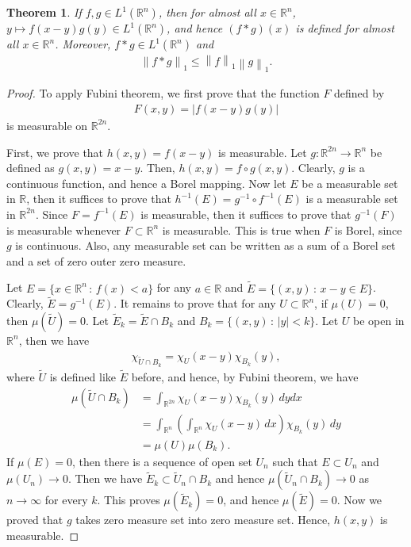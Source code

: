 \documentclass[11pt]{book}
\newtheorem{theorem}{Theorem}[chapter]
\theoremstyle{definition}
\numberwithin{equation}{chapter}
\begin{document}
\begin{theorem}
If $f, g \in L^1(\mathbb{R}^n)$, then for almost all $x \in \mathbb{R}^n$, $y \mapsto f(x-y)g(y) \in L^1(\mathbb{R}^n)$, and hence $(f*g)(x)$ is defined for almost all $x \in \mathbb{R}^n$. Moreover, $f*g \in L^1(\mathbb{R}^n)$ and
\begin{align*}
    \left\|f*g\right\|_1 \leq \left\|f\right\|_1 \left\|g\right\|_1.
\end{align*}
\end{theorem}
\begin{proof}
To apply Fubini theorem, we first prove that the function $F$ defined by 
\begin{align*}
    F(x,y) = \left|f(x-y)g(y)\right|
\end{align*}
is measurable on $\mathbb{R}^{2n}$.

First, we prove that $h(x,y) = f(x-y)$ is measurable. Let $g: \mathbb{R}^{2n} \to \mathbb{R}^{n}$ be defined as $g(x,y) = x - y$. Then, $h(x,y) = f \circ g(x,y)$. Clearly, $g$ is a continuous function, and hence a Borel mapping. Now let $E$ be a measurable set in $\mathbb{R}$, then it suffices to prove that $h^{-1}(E) = g^{-1} \circ f^{-1}(E)$ is a measurable set in $\mathbb{R}^{2n}$. Since $F = f^{-1}(E)$ is measurable, then it suffices to prove that $g^{-1}(F)$ is measurable whenever $F \subset \mathbb{R}^n$ is measurable. This is true when $F$ is Borel, since $g$ is continuous. Also, any measurable set can be written as a sum of a Borel set and a set of zero outer zero measure. 
    
Let $E = \{x \in \mathbb{R}^n \,:\, f(x) < a\}$ for any $a \in \mathbb{R}$ and $\widetilde{E} = \{(x,y) \,:\, x - y \in E\}$. Clearly, $\widetilde{E} = g^{-1}(E)$. It remains to prove that for any $U \subset \mathbb{R}^n$, if $\mu(U) = 0$, then $\mu(\widetilde{U}) = 0$. Let $\widetilde{E}_k = \widetilde{E} \cap B_k$ and $B_k = \{(x,y) \,:\, \left|y\right| < k\}$. Let $U$ be open in $\mathbb{R}^n$, then we have
\begin{align*}
    \chi_{\widetilde{U} \cap B_k} = \chi_{U}(x-y) \chi_{B_k}(y),
\end{align*}
where $\widetilde{U}$ is defined like $\widetilde{E}$ before, and hence, by Fubini theorem, we have
\begin{align*}
    \mu\left(\widetilde{U} \cap B_k\right) & = \int_{\mathbb{R}^{2n}} \chi_{U}(x-y) \chi_{B_k}(y) \,dy dx \\
    & = \int_{\mathbb{R}^{n}} \left(\int_{\mathbb{R}^{n}} \chi_{U}(x-y) \,dx\right) \chi_{B_k}(y) \,dy \\
    & = \mu(U) \mu(B_k).
\end{align*}
If $\mu(E) = 0$, then there is a sequence of open set $U_n$ such that $E \subset U_n$ and $\mu(U_n) \to 0$. Then we have $\widetilde{E}_k \subset \widetilde{U}_n \cap B_k$  and hence $\mu(\widetilde{U}_n \cap B_k) \to 0$ as $n \to \infty$ for every $k$. This proves $\mu(\widetilde{E}_k) = 0$, and hence $\mu(\widetilde{E}) = 0$. Now we proved that $g$ takes zero measure set into zero measure set. Hence, $h(x,y)$ is measurable.


\end{proof}
\end{document}
